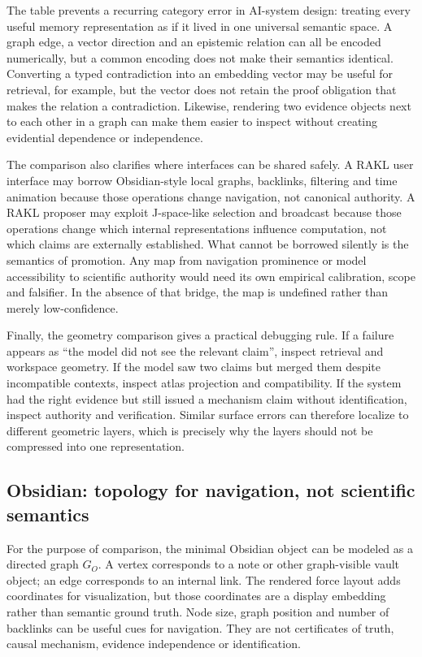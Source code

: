 The table prevents a recurring category error in AI-system design: treating every useful memory representation as if it lived in one universal semantic space. A graph edge, a vector direction and an epistemic relation can all be encoded numerically, but a common encoding does not make their semantics identical. Converting a typed contradiction into an embedding vector may be useful for retrieval, for example, but the vector does not retain the proof obligation that makes the relation a contradiction. Likewise, rendering two evidence objects next to each other in a graph can make them easier to inspect without creating evidential dependence or independence.

The comparison also clarifies where interfaces can be shared safely. A RAKL user interface may borrow Obsidian-style local graphs, backlinks, filtering and time animation because those operations change navigation, not canonical authority. A RAKL proposer may exploit J-space-like selection and broadcast because those operations change which internal representations influence computation, not which claims are externally established. What cannot be borrowed silently is the semantics of promotion. Any map from navigation prominence or model accessibility to scientific authority would need its own empirical calibration, scope and falsifier. In the absence of that bridge, the map is undefined rather than merely low-confidence.

Finally, the geometry comparison gives a practical debugging rule. If a failure appears as ``the model did not see the relevant claim'', inspect retrieval and workspace geometry. If the model saw two claims but merged them despite incompatible contexts, inspect atlas projection and compatibility. If the system had the right evidence but still issued a mechanism claim without identification, inspect authority and verification. Similar surface errors can therefore localize to different geometric layers, which is precisely why the layers should not be compressed into one representation.

\subsection{Obsidian: topology for navigation, not scientific semantics}

For the purpose of comparison, the minimal Obsidian object can be modeled as a directed graph \(G_O\). A vertex corresponds to a note or other graph-visible vault object; an edge corresponds to an internal link. The rendered force layout adds coordinates for visualization, but those coordinates are a display embedding rather than semantic ground truth. Node size, graph position and number of backlinks can be useful cues for navigation. They are not certificates of truth, causal mechanism, evidence independence or identification.

